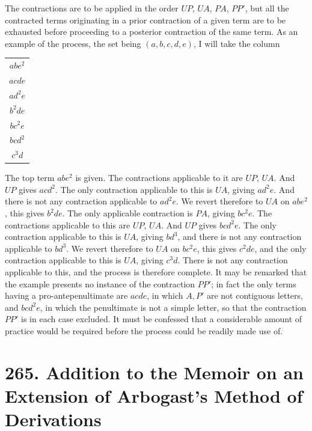 \documentclass[11pt,a4paper]{article}
\theoremstyle{definition}
\begin{document}
The contractions are to be applied in the order $UP$, $UA$, $PA$, $PP'$, but all the contracted terms originating in a prior contraction of a given term are to be exhausted before proceeding to a posterior contraction of the same term. As an example of the process, the set being $(a,b,c,d,e)$, I will take the column
\begin{center}
\begin{tabular}{c}
$abe^2$ \\
$acde$ \\
$ad^2e$ \\
$b^2de$ \\
$bc^2e$ \\
$bcd^2$ \\
$c^3d$ \\
\end{tabular}
\end{center}

The top term $abe^2$ is given. The contractions applicable to it are $UP$, $UA$. And $UP$ gives $acd^2$. The only contraction applicable to this is $UA$, giving $ad^2e$. And there is not any contraction applicable to $ad^2e$. We revert therefore to $UA$ on $abe^2$, this gives $b^2de$. The only applicable contraction is $PA$, giving $bc^2e$. The contractions applicable to this are $UP$, $UA$. And $UP$ gives $bcd^2e$. The only contraction applicable to this is $UA$, giving $bd^3$, and there is not any contraction applicable to $bd^3$. We revert therefore to $UA$ on $bc^2e$, this gives $c^2de$, and the only contraction applicable to this is $UA$, giving $c^3d$. There is not any contraction applicable to this, and the process is therefore complete. It may be remarked that the example presents no instance of the contraction $PP'$; in fact the only terms having a pro-antepenultimate are $acde$, in which $A,P'$ are not contiguous letters, and $bcd^2e$, in which the penultimate is not a simple letter, so that the contraction $PP'$ is in each case excluded. It must be confessed that a considerable amount of practice would be required before the process could be readily made use of.

\newpage
\section[265. Addition to the Memoir on Arbogast's Method]{265. Addition to the Memoir on an Extension of Arbogast's Method of Derivations}
\end{document}

